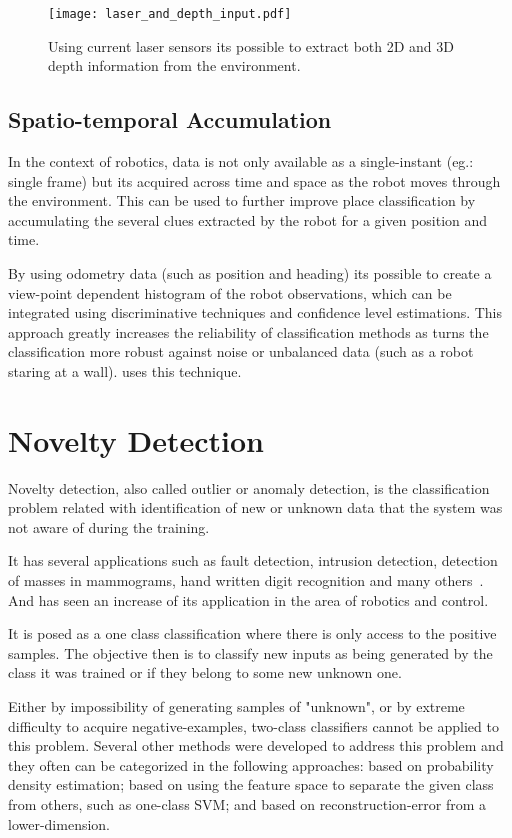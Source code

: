\begin{figure}[h!]
\center
\texttt{[image: laser\_and\_depth\_input.pdf]}
\caption{Using current laser sensors its possible to extract both 2D and 3D depth information from the environment.}
\end{figure}

\subsection{Spatio-temporal Accumulation}
\label{sec:accumulation}
In the context of robotics, data is not only available as a single-instant (eg.: single frame) but its acquired across time and space as the robot moves through the environment.
This can be used to further improve place classification by accumulating the several clues extracted by the robot for a given position and time.

By using odometry data (such as position and heading) its possible to create a view-point dependent histogram of the robot observations, which can be integrated using discriminative techniques and confidence level estimations. This approach greatly increases the reliability of classification methods as turns the classification more robust against noise or unbalanced data (such as a robot staring at a wall). \cite{pronobis2010ijrr} uses this technique.


\newpage
\section{Novelty Detection}
\label{sec:novelty-detection}
Novelty detection, also called outlier or anomaly detection, is the classification problem related with identification of new or unknown data that the system was not aware of during the training.

It has several applications such as fault detection, intrusion detection, detection of masses in mammograms, hand written digit recognition and many others~\citep{markou2003novelty}.
And has seen an increase of its application in the area of robotics and control.

It is posed as a one class classification where there is only access to the positive samples.
The objective then is to classify new inputs as being generated by the class it was trained or if they belong to some new unknown one.

Either by impossibility of generating samples of "unknown", or by extreme difficulty to acquire negative-examples, two-class classifiers cannot be applied to this problem.
Several other methods were developed to address this problem and they often can be categorized in the following approaches:
based on probability density estimation;
based on using the feature space to separate the given class from others, such as one-class \gls{SVM};
and based on reconstruction-error from a lower-dimension.



